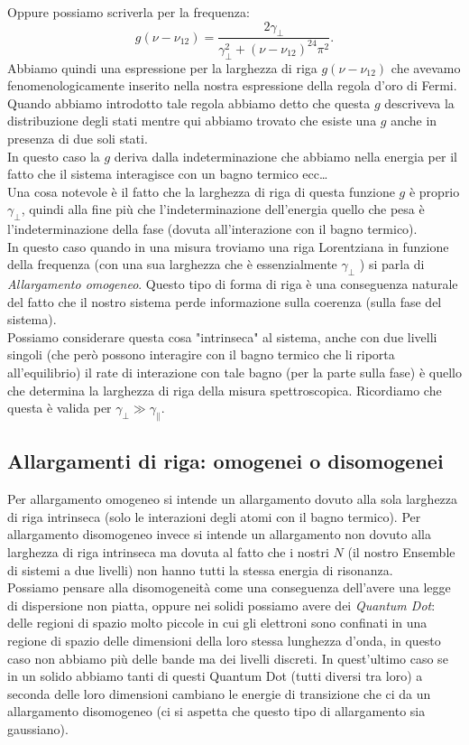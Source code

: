 Oppure possiamo scriverla per la frequenza:
\[
    g(\nu-\nu_{12}) = 
    \frac{2\gamma_\perp}
    {\gamma_\perp^2+\left(\nu-\nu_{12}\right)^24\pi^2}
.\] 
Abbiamo quindi una espressione per la larghezza di riga $g(\nu-\nu_{12})$ che avevamo fenomenologicamente inserito nella nostra espressione della regola d'oro di Fermi. Quando abbiamo introdotto tale regola abbiamo detto che questa $g$ descriveva la distribuzione degli stati mentre qui abbiamo trovato che esiste una $g$ anche in presenza di due soli stati.\\
In questo caso la $g$ deriva dalla indeterminazione che abbiamo nella energia per il fatto che il sistema interagisce con un bagno termico ecc\ldots\\
Una cosa notevole è il fatto che la larghezza di riga di questa funzione $g$ è proprio $\gamma_\perp$, quindi alla fine più che l'indeterminazione dell'energia quello che pesa  è l'indeterminazione della fase (dovuta all'interazione con il bagno termico).\\
In questo caso quando in una misura troviamo una riga Lorentziana in funzione della frequenza (con una sua larghezza che è essenzialmente $\gamma_\perp$ ) si parla di \textit{Allargamento omogeneo}.
Questo tipo di forma di riga è una conseguenza naturale del fatto che il nostro sistema perde informazione sulla coerenza (sulla fase del sistema). \\
Possiamo considerare questa cosa "intrinseca" al sistema, anche con due livelli singoli (che però possono interagire con il bagno termico che li riporta all'equilibrio) il rate di interazione con tale bagno (per la parte sulla fase) è quello che determina la larghezza di riga della misura spettroscopica. Ricordiamo che questa è valida per  $\gamma_\perp\gg \gamma_\parallel$. 
\subsection{Allargamenti di riga: omogenei o disomogenei}%
Per allargamento omogeneo si intende un allargamento dovuto alla sola larghezza di riga intrinseca (solo le interazioni degli atomi con il bagno termico). Per allargamento disomogeneo invece si intende un allargamento non dovuto alla larghezza di riga intrinseca ma dovuta al fatto che i nostri $N$ (il nostro Ensemble di sistemi a due livelli) non hanno tutti la stessa energia di risonanza. \\
Possiamo pensare alla disomogeneità come una conseguenza dell'avere una legge di dispersione non piatta, oppure nei solidi possiamo avere dei \textit{Quantum Dot}: delle regioni di spazio molto piccole in cui gli elettroni sono confinati in una regione di spazio delle dimensioni della loro stessa lunghezza d'onda, in questo caso non abbiamo più delle bande ma dei livelli discreti. In quest'ultimo caso se in un solido abbiamo tanti di questi Quantum Dot (tutti diversi tra loro) a seconda delle loro dimensioni cambiano le energie di transizione che ci da un allargamento disomogeneo (ci si aspetta che questo tipo di allargamento sia gaussiano).
